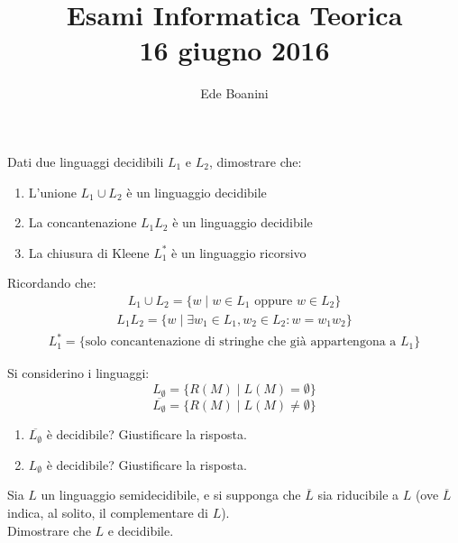 \documentclass{article}  %
\title{Esami Informatica Teorica \\ 16 giugno 2016}
\author{Ede Boanini}
\date{}  %
\begin{document}
\maketitle
\begin{esercizio}[Esercizio 1]
Dati due linguaggi decidibili $L_1$ e $L_2$, dimostrare che:
\begin{enumerate}
    \item L'unione $L_1 \cup L_2$ è un linguaggio decidibile
    \item La concantenazione $L_1L_2$ è un linguaggio decidibile
    \item La chiusura di Kleene $L_1^*$ è un linguaggio ricorsivo
\end{enumerate}
Ricordando che:
\begin{align*}
    L_1 \cup L_2 = \{w \mid w \in L_1 \text{ oppure } w \in L_2\}
\end{align*}
\begin{align*}
    L_1L_2= \{w \mid \exists w_1 \in L_1, w_2 \in L_2 : w=w_1w_2\}
\end{align*}
\begin{align*}
    L_1^*= \{\text{solo concantenazione di stringhe che già appartengona a } L_1\}
\end{align*}
\end{esercizio}

\begin{esercizio}[Esercizio 3]
Si considerino i linguaggi:
\[
    L_{\emptyset}=\{R(M) \mid L(M)=\emptyset\}
\]
\[
    \overline{L_{\emptyset}}=\{R(M) \mid L(M) \neq \emptyset\}
\]
\begin{enumerate}
    \item $\overline{L_{\emptyset}}$ è decidibile? Giustificare la risposta.
    \item $L_{\emptyset}$ è decidibile? Giustificare la risposta.
\end{enumerate}
\end{esercizio}

\begin{esercizio}[Esercizio 4]
Sia $L$ un linguaggio semidecidibile, e si supponga che $\overline{L}$ sia riducibile
 a $L$ (ove $\overline{L}$ indica, al solito, il complementare di $L$).  \\ Dimostrare che $L$
 e decidibile.
\end{esercizio}
\end{document}
